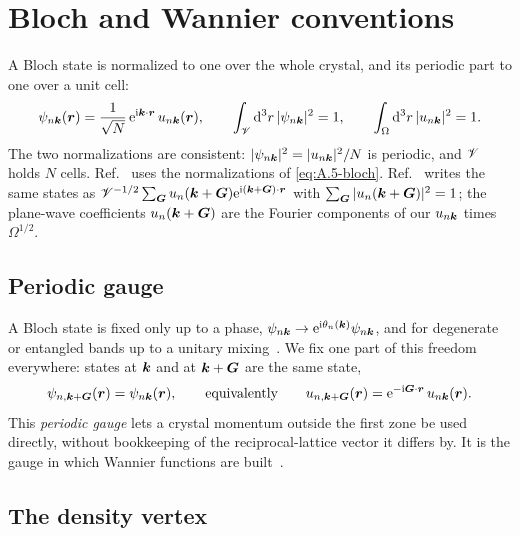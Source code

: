 \section{Bloch and Wannier conventions}\label{app:A.5}

A Bloch state is normalized to one over the whole crystal, and its periodic part to one over a unit cell:
\begin{equation}
  \psi_{n\bm{k}}(\bm{r}) = \frac{1}{\sqrt N}\,\mathrm{e}^{\mathrm{i}\bm{k}\cdot\bm{r}}\,u_{n\bm{k}}(\bm{r}), \qquad
  \int_{\mathscr{V}}\mathrm{d}^3r\,|\psi_{n\bm{k}}|^2 = 1, \qquad
  \int_\Omega\mathrm{d}^3r\,|u_{n\bm{k}}|^2 = 1 .
  \label{eq:A.5-bloch}
\end{equation}
The two normalizations are consistent: $|\psi_{n\bm{k}}|^2 = |u_{n\bm{k}}|^2/N$ is periodic, and $\mathscr{V}$ holds $N$ cells. Ref.~\cite[Eq.~(29)]{giustino2017electron} uses the normalizations of \cref{eq:A.5-bloch}. Ref.~\cite[Eqs.~(3.14) and (3.15)]{essig2016direct} writes the same states as $\mathscr{V}^{-1/2}\sum_{\bm{G}}u_n(\bm{k}+\bm{G})\mathrm{e}^{\mathrm{i}(\bm{k}+\bm{G})\cdot\bm{r}}$ with $\sum_{\bm{G}}|u_n(\bm{k}+\bm{G})|^2 = 1$; the plane-wave coefficients $u_n(\bm{k}+\bm{G})$ are the Fourier components of our $u_{n\bm{k}}$ times $\Omega^{1/2}$.

\subsection{Periodic gauge}

A Bloch state is fixed only up to a phase, $\psi_{n\bm{k}} \to \mathrm{e}^{\mathrm{i}\theta_n(\bm{k})}\psi_{n\bm{k}}$, and for degenerate or entangled bands up to a unitary mixing~\cite[Eqs.~(6), (7) and (10)]{marzari2012maximally}. We fix one part of this freedom everywhere: states at $\bm{k}$ and at $\bm{k}+\bm{G}$ are the same state,
\begin{equation}
  \psi_{n,\bm{k}+\bm{G}}(\bm{r}) = \psi_{n\bm{k}}(\bm{r}), \qquad\text{equivalently}\qquad
  u_{n,\bm{k}+\bm{G}}(\bm{r}) = \mathrm{e}^{-\mathrm{i}\bm{G}\cdot\bm{r}}\,u_{n\bm{k}}(\bm{r}).
  \label{eq:A.5-periodic}
\end{equation}
This \emph{periodic gauge} lets a crystal momentum outside the first zone be used directly, without bookkeeping of the reciprocal-lattice vector it differs by. It is the gauge in which Wannier functions are built~\cite[Sect.~II\,A, footnote~1, and Eq.~(10)]{marzari2012maximally}.

\subsection{The density vertex}

